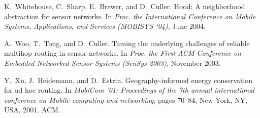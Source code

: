 \documentclass{sig-alternate}
\begin{document}
\begin{footnotesize}
\begin{thebibliography}{10}
K.~Whitehouse, C.~Sharp, E.~Brewer, and D.~Culler.
\newblock Hood: {A} neighborhood abstraction for sensor networks.
\newblock In {\em Proc. the International Conference on Mobile Systems,
  Applications, and Services (MOBISYS `04)}, June 2004.

A.~Woo, T.~Tong, and D.~Culler.
\newblock Taming the underlying challenges of reliable multihop routing in
  sensor networks.
\newblock In {\em Proc. the First ACM Conference on Embedded Networked Sensor
  Systems (SenSys 2003)}, November 2003.

Y.~Xu, J.~Heidemann, and D.~Estrin.
\newblock Geography-informed energy conservation for ad hoc routing.
\newblock In {\em MobiCom '01: Proceedings of the 7th annual international
  conference on Mobile computing and networking}, pages 70--84, New York, NY,
  USA, 2001. ACM.

\end{thebibliography}
\end{footnotesize}
\end{document}
